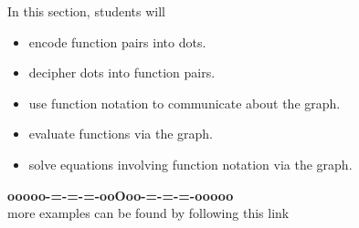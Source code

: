 \documentclass{ximera}
\begin{document}
\begin{sectionOutcomes}
In this section, students will 

\begin{itemize}
\item encode function pairs into dots.
\item decipher dots into function pairs.
\item use function notation to communicate about the graph.
\item evaluate functions via the graph.
\item solve equations involving function notation via the graph.
\end{itemize}
\end{sectionOutcomes}













\begin{onlineOnly}
\begin{center}
\textbf{\textcolor{green!50!black}{ooooo-=-=-=-ooOoo-=-=-=-ooooo}} \\

more examples can be found by following this link\\ 

\end{center}
\end{onlineOnly}
\end{document}
